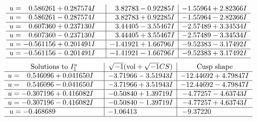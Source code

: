 \documentclass[1p]{elsarticle_modified}
\theoremstyle{definition}
\newcommand{\I}{\sqrt{-1}}
\begin{document}
$$\begin{array}{c|c|c}
\begin{aligned}
u &= \phantom{-}0.586261 + 0.287574 I\end{aligned}
 & \phantom{-}3.82783 - 0.92285 I & -1.55964 + 2.82366 I \\ \hline\begin{aligned}
u &= \phantom{-}0.586261 - 0.287574 I\end{aligned}
 & \phantom{-}3.82783 + 0.92285 I & -1.55964 - 2.82366 I \\ \hline\begin{aligned}
u &= \phantom{-}0.607360 + 0.237130 I\end{aligned}
 & \phantom{-}3.44405 - 3.55467 I & -2.57489 + 3.34534 I \\ \hline\begin{aligned}
u &= \phantom{-}0.607360 - 0.237130 I\end{aligned}
 & \phantom{-}3.44405 + 3.55467 I & -2.57489 - 3.34534 I \\ \hline\begin{aligned}
u &= -0.561156 + 0.201491 I\end{aligned}
 & -1.41921 + 1.66796 I & -9.52383 - 3.17492 I \\ \hline\begin{aligned}
u &= -0.561156 - 0.201491 I\end{aligned}
 & -1.41921 - 1.66796 I & -9.52383 + 3.17492 I\\
 \hline 
 \end{array}$$\newpage$$\begin{array}{c|c|c}  
\text{Solutions to }I^u_{1}& \I (\text{vol} + \sqrt{-1}CS) & \text{Cusp shape}\\
 \hline 
\begin{aligned}
u &= \phantom{-}0.546096 + 0.041650 I\end{aligned}
 & -3.71966 - 3.51943 I & -12.44692 + 4.79847 I \\ \hline\begin{aligned}
u &= \phantom{-}0.546096 - 0.041650 I\end{aligned}
 & -3.71966 + 3.51943 I & -12.44692 - 4.79847 I \\ \hline\begin{aligned}
u &= -0.307196 + 0.416082 I\end{aligned}
 & -0.50840 + 1.39719 I & -4.77257 - 4.63743 I \\ \hline\begin{aligned}
u &= -0.307196 - 0.416082 I\end{aligned}
 & -0.50840 - 1.39719 I & -4.77257 + 4.63743 I \\ \hline\begin{aligned}
u &= -0.468689\phantom{ +0.000000I}\end{aligned}
 & -1.06413\phantom{ +0.000000I} & -9.37220\phantom{ +0.000000I}\\
 \hline 
 \end{array}$$\newpage
\end{document}
